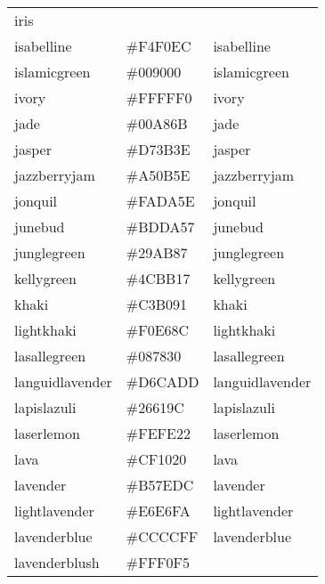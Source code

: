 \documentclass[
]{article}
\begin{document}
\begin{longtable}[]{@{}lll@{}}
\textcolor[rgb]{0.35,0.31,0.81}{iris                  }\tabularnewline
isabelline & \colorbox[rgb]{0.96,0.94,0.93}{\#F4F0EC} &
\textcolor[rgb]{0.96,0.94,0.93}{isabelline            }\tabularnewline
islamicgreen & \colorbox[rgb]{0.0,0.56,0.0}{\#009000} &
\textcolor[rgb]{0.0,0.56,0.0}{islamicgreen          }\tabularnewline
ivory & \colorbox[rgb]{1.0,1.0,0.94}{\#FFFFF0} &
\textcolor[rgb]{1.0,1.0,0.94}{ivory                 }\tabularnewline
jade & \colorbox[rgb]{0.0,0.66,0.42}{\#00A86B} &
\textcolor[rgb]{0.0,0.66,0.42}{jade                  }\tabularnewline
jasper & \colorbox[rgb]{0.84,0.23,0.24}{\#D73B3E} &
\textcolor[rgb]{0.84,0.23,0.24}{jasper                }\tabularnewline
jazzberryjam & \colorbox[rgb]{0.65,0.04,0.37}{\#A50B5E} &
\textcolor[rgb]{0.65,0.04,0.37}{jazzberryjam          }\tabularnewline
jonquil & \colorbox[rgb]{0.98,0.85,0.37}{\#FADA5E} &
\textcolor[rgb]{0.98,0.85,0.37}{jonquil               }\tabularnewline
junebud & \colorbox[rgb]{0.74,0.85,0.34}{\#BDDA57} &
\textcolor[rgb]{0.74,0.85,0.34}{junebud               }\tabularnewline
junglegreen & \colorbox[rgb]{0.16,0.67,0.53}{\#29AB87} &
\textcolor[rgb]{0.16,0.67,0.53}{junglegreen           }\tabularnewline
kellygreen & \colorbox[rgb]{0.3,0.73,0.09}{\#4CBB17} &
\textcolor[rgb]{0.3,0.73,0.09}{kellygreen            }\tabularnewline
khaki & \colorbox[rgb]{0.76,0.69,0.57}{\#C3B091} &
\textcolor[rgb]{0.76,0.69,0.57}{khaki                 }\tabularnewline
lightkhaki & \colorbox[rgb]{0.94,0.9,0.55}{\#F0E68C} &
\textcolor[rgb]{0.94,0.9,0.55}{lightkhaki            }\tabularnewline
lasallegreen & \colorbox[rgb]{0.03,0.47,0.19}{\#087830} &
\textcolor[rgb]{0.03,0.47,0.19}{lasallegreen          }\tabularnewline
languidlavender & \colorbox[rgb]{0.84,0.79,0.87}{\#D6CADD} &
\textcolor[rgb]{0.84,0.79,0.87}{languidlavender       }\tabularnewline
lapislazuli & \colorbox[rgb]{0.15,0.38,0.61}{\#26619C} &
\textcolor[rgb]{0.15,0.38,0.61}{lapislazuli           }\tabularnewline
laserlemon & \colorbox[rgb]{1.0,1.0,0.13}{\#FEFE22} &
\textcolor[rgb]{1.0,1.0,0.13}{laserlemon            }\tabularnewline
lava & \colorbox[rgb]{0.81,0.06,0.13}{\#CF1020} &
\textcolor[rgb]{0.81,0.06,0.13}{lava                  }\tabularnewline
lavender & \colorbox[rgb]{0.71,0.49,0.86}{\#B57EDC} &
\textcolor[rgb]{0.71,0.49,0.86}{lavender              }\tabularnewline
lightlavender & \colorbox[rgb]{0.9,0.9,0.98}{\#E6E6FA} &
\textcolor[rgb]{0.9,0.9,0.98}{lightlavender         }\tabularnewline
lavenderblue & \colorbox[rgb]{0.8,0.8,1.0}{\#CCCCFF} &
\textcolor[rgb]{0.8,0.8,1.0}{lavenderblue          }\tabularnewline
lavenderblush & \colorbox[rgb]{1.0,0.94,0.96}{\#FFF0F5} &

\end{longtable}
\end{document}
